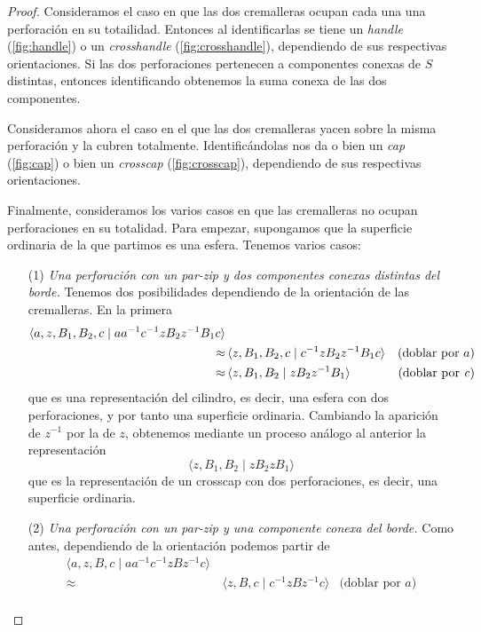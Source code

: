 \documentclass[10pt]{report}
\theoremstyle{definition}
\begin{document}
\begin{proof}
Consideramos el caso en que las dos cremalleras ocupan cada una una perforación en su totailidad. Entonces al identificarlas se tiene un \textit{handle} (\autoref{fig:handle}) o un \textit{crosshandle} (\autoref{fig:crosshandle}), dependiendo de sus respectivas orientaciones. Si las dos perforaciones pertenecen a componentes conexas de $S$ distintas, entonces identificando obtenemos la suma conexa de las dos componentes. 

Consideramos ahora el caso en el que las dos cremalleras yacen sobre la misma perforación y la cubren totalmente. Identificándolas nos da o bien un \textit{cap} (\autoref{fig:cap}) o bien un \textit{crosscap} (\autoref{fig:crosscap}), dependiendo de sus respectivas orientaciones.

Finalmente, consideramos los varios casos en que las cremalleras no ocupan perforaciones en su totalidad. Para empezar, supongamos que la superficie ordinaria de la que partimos es una esfera. Tenemos varios casos:
\begin{itemize}
\item[(1)] \textit{Una perforación con un par-zip y dos componentes conexas distintas del borde.} Tenemos dos posibilidades dependiendo de la orientación de las cremalleras. En la primera 
\begin{align*}
\langle a,z,B_1,B_2,c\mid aa^{-1} c^{-1}zB_2z^{-1}B_1c\rangle & & \\
\approx & \, \langle z,B_1,B_2,c\mid c^{-1}zB_2z^{-1}B_1c\rangle &\text{(doblar por } a\text{)}\\
\approx & \, \langle z,B_1,B_2\mid zB_2z^{-1}B_1\rangle &\text{(doblar por \textit{c})}
\end{align*}
que es una representación del cilindro, es decir, una esfera con dos perforaciones, y por tanto una superficie ordinaria. Cambiando la aparición de $z^{-1}$ por la de $z$, obtenemos mediante un proceso análogo al anterior la representación
\[ \langle z,B_1,B_2\mid zB_2zB_1 \rangle
\]
que es la representación de un crosscap con dos perforaciones, es decir, una superficie ordinaria.
\item[(2)] \textit{Una perforación con un par-zip y una componente conexa del borde.} Como antes, dependiendo de la orientación podemos partir de 
\begin{align*}
\langle a,z,B,c\mid aa^{-1} c^{-1}zBz^{-1}c\rangle & & \\
\approx & \, \langle z,B,c\mid c^{-1}zBz^{-1}c\rangle &\text{(doblar por } a\text{)}\\

\end{align*}
\end{itemize}
\end{proof}
\end{document}
